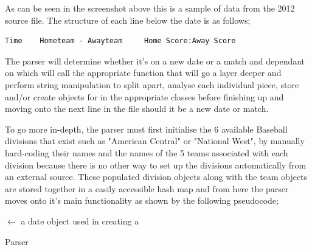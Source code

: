 As can be seen in the screenshot above this is a sample of data from
the 2012 source file. The structure of each line below the date is as
follows; 
 
\begin{verbatim}
Time 	Hometeam - Awayteam 	Home Score:Away Score
\end{verbatim}

The parser will determine whether it's on a new date or a match and
dependant on which will call the appropriate function that will go a
layer deeper and perform string manipulation to split apart, analyse
each individual piece, store and/or create objects for in the
appropriate classes before finishing up and moving onto the next line
in the file should it be a new date or match. 

To go more in-depth, the parser must first initialise the 6 available
Baseball divisions that exist such as "American Central" or "National
West", by manually hard-coding their names and the names of the 5
teams associated with each division because there is no other way to
set up the divisions automatically from an external source. These
populated division objects along with the team objects are stored
together in a easily accessible hash map and from here the parser
moves onto it's main functionality as shown by the following
pseudocode; 

\IncMargin{2em}
\begin{algorithm}
  \SetAlgoLined
   
   
   
  
  \Date $\leftarrow$ a date object used in creating a \Match\;
    \caption{Parser}\label{PARSER}
\end{algorithm}
\DecMargin{2em}
\newpage

